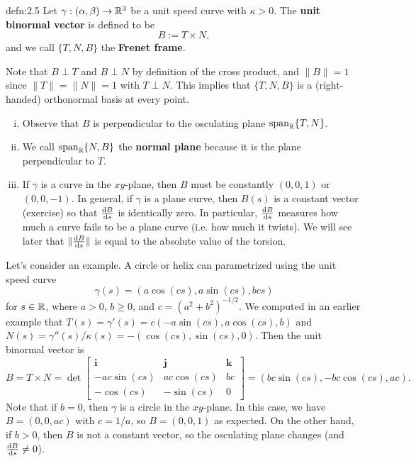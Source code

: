 \begin{defn}{defn:2.5}
    Let $\gamma : (\alpha, \beta) \to \mathbb{R}^3$ be a unit speed curve with 
    $\kappa > 0$. The {\bf unit binormal vector} is defined to be 
    \[ B := T \times N, \] 
    and we call $\{T, N, B\}$ the {\bf Frenet frame}. 
\end{defn}\vspace{-0.25cm}

Note that $B \perp T$ and $B \perp N$ by definition of the cross product, 
and $\|B\|= 1$ since $\|T\| = \|N\| = 1$ with $T \perp N$. This implies that 
$\{T, N, B\}$ is a (right-handed) orthonormal basis at every point. 
\begin{enumerate}[(i)]
    \item Observe that $B$ is perpendicular to the osculating plane $\operatorname{span}_{\mathbb{R}}\{T, N\}$. 
    \item We call $\operatorname{span}_{\mathbb{R}}\{N, B\}$ the {\bf normal plane} because it is 
    the plane perpendicular to $T$. 
    \item If $\gamma$ is a curve in the $xy$-plane, then $B$ must be constantly 
    $(0, 0, 1)$ or $(0, 0, -1)$. In general, if $\gamma$ is a plane curve, 
    then $B(s)$ is a constant vector (exercise) so that $\frac{{\rm d}B}{{\rm d}s}$ is 
    identically zero. In particular, $\frac{{\rm d}B}{{\rm d}s}$ measures how much 
    a curve fails to be a plane curve (i.e. how much it twists). 
    We will see later that $\|\frac{{\rm d}B}{{\rm d}s}\|$ is equal to the absolute value 
    of the torsion. 
\end{enumerate}

Let's consider an example. A circle or helix can parametrized using the 
unit speed curve 
\[ \gamma(s) = (a\cos(cs), a\sin(cs), bcs) \] 
for $s \in \mathbb{R}$, where $a > 0$, $b \geq 0$, and $c = (a^2 + b^2)^{-1/2}$. 
We computed in an earlier example that 
$T(s) = \gamma'(s) = c(-a\sin(cs), a\cos(cs), b)$ and 
$N(s) = \gamma''(s)/\kappa(s) = -(\cos(cs), \sin(cs), 0)$. 
Then the unit binormal vector is 
\[ B = T \times N = \det \begin{bmatrix}
    \mathbf i & \mathbf j & \mathbf k \\ 
    -ac\sin(cs) & ac\cos(cs) & bc \\ 
    -\cos(cs) & -\sin(cs) & 0
\end{bmatrix} = (bc\sin(cs), -bc\cos(cs), ac). \] 
Note that if $b = 0$, then $\gamma$ is a circle in the $xy$-plane. 
In this case, we have $B = (0, 0, ac)$ with $c = 1/a$, so $B = (0, 0, 1)$ 
as expected. On the other hand, if $b > 0$, then $B$ is not a constant 
vector, so the osculating plane changes (and $\frac{{\rm d}B}{{\rm d}s} \neq 0$).

